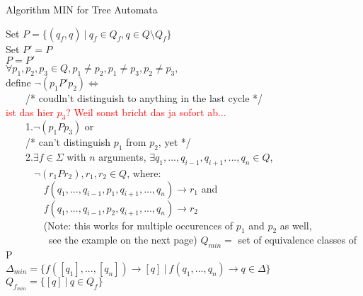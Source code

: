 \documentclass{llncs}
\begin{document}
\begin{definition}{Algorithm MIN for Tree Automata} \cite{martens-uni-dortmund-lecture02}\\
	\begin{algorithm}[H]
		Set \(P = \{(q_f, q)~|~q_f \in Q_f, q \in Q \setminus Q_f\}\)\\
		Set \(P' = P\)\\
		 {
			\(P = P'\)\\
			\(\forall p_1, p_2, p_3 \in Q, p_1 \neq p_2, p_1 \neq p_3, p_2 \neq p_3,\)\\
			define \(\neg (p_1P'p_2) \iff\)\\
			~~~~/* coudln't distinguish to anything in the last cycle */\\
			\textcolor{red}{ist das hier \(p_3\)? Weil sonst bricht das ja sofort ab...}\\
			~~~~1.\(\neg(p_1Pp_3)\) or\\
			~~~~/* can't distinguish \(p_1\) from \(p_2\), yet */\\
			~~~~2.\(\exists f \in \Sigma\) with \(n\) arguments, \(\exists q_1, ..., q_{i-1}, q_{i+1}, ..., q_n \in Q\), \\
			~~~~~ \(\neg(r_1Pr_2), r_1, r_2 \in Q\), where: \\
			~~~~~~~ \(f(q_1, ..., q_{i-1}, p_1, q_{i+1}, ..., q_n) \rightarrow r_1\) and\\
			~~~~~~~ \(f(q_1, ..., q_{i-1}, p_2, q_{i+1}, ..., q_n) \rightarrow r_2\) \\
			~~~~~~~ (Note: this works for multiple occurences of \(p_1\) and \(p_2\) as well, \\
			~~~~~~~~ see the example on the next page)
		}
		\(Q_{min} = \) set of equivalence classes of P \\
		\(\Delta_{min} = \{f([q_1], ..., [q_n]) \rightarrow [q]~|~f(q_1, ..., q_n) \rightarrow q \in \Delta\}\)\\
		\(Q_{f_{min}} = \{[q]~|~q \in Q_f\}\)\\
	\end{algorithm}
\end{definition}

\pagebreak
\end{document}

